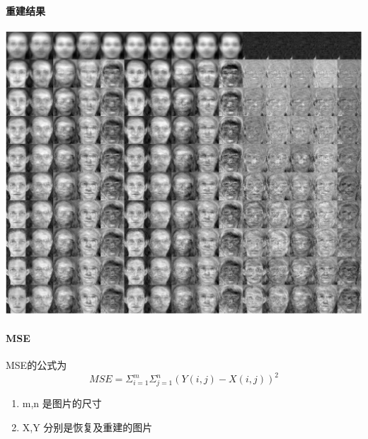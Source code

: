 	\paragraph{重建结果}
\begin{center}
\begin{minipage}[t]{\linewidth}
\center
{
\includegraphics[width=\textwidth]{Img/pni_recon_re} 
	\label{fig:pni_recon_re}
}
\end{minipage}
\medskip
\end{center}
\paragraph{MSE}
MSE的公式为\begin{equation}
		MSE = \Sigma_{i=1}^m\Sigma_{j=1}^n(Y(i,j) - X(i,j))^2	\end{equation}
	
	\begin{enumerate}
	\item m,n 是图片的尺寸
	\item X,Y 分别是恢复及重建的图片
\end{enumerate}


